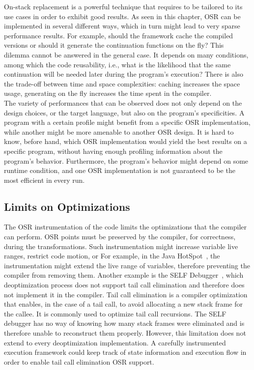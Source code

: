 On-stack replacement is a powerful technique that requires to be tailored to its use cases in order to exhibit good results.
As seen in this chapter, OSR can be implemented in several different ways, which in turn might lead to very sparse performance results.
For example, should the framework cache the compiled versions or should it generate the continuation functions on the fly?
This dilemma cannot be answered in the general case.
It depends on many conditions, among which the code reusability, i.e., what is the likelihood that the same continuation will be needed later during the program's execution?
There is also the trade-off between time and space complexities: caching increases the space usage, generating on the fly increases the time spent in the compiler.\\

The variety of performances that can be observed does not only depend on the design choices, or the target language, but also on the program's specificities.
A program with a certain profile might benefit from a specific OSR implementation, while another might be more amenable to another OSR design.
It is hard to know, before hand, which OSR implementation would yield the best results on a specific program, without having enough profiling information about the program's behavior. 
Furthermore, the program's behavior might depend on some runtime condition, and one OSR implementation is not guaranteed to be the most efficient in every run.  

\subsection{Limits on Optimizations}

The OSR instrumentation of the code limits the optimizations that the compiler can perform.
OSR points must be preserved by the compiler, for correctness, during the transformations.
Such instrumentation might increase variable live ranges, restrict code motion, or 
For example, in the Java HotSpot~\cite{paleczny2001java}, the instrumentation might extend the live range of variables, therefore preventing the compiler from removing them.
Another example is the SELF Debugger~\cite{holzle1992debugging}, which deoptimization process does not support tail call elimination and therefore does not implement it in the compiler.
Tail call elimination is a compiler optimization that enables, in the case of a tail call, to avoid allocating a new stack frame for the callee. 
It is commonly used to optimize tail call recursions.
The SELF debugger has no way of knowing how many stack frames were eliminated and is therefore unable to reconstruct them properly.
However, this limitation does not extend to every deoptimization implementation.
A carefully instrumented execution framework could keep track of state information and execution flow in order to enable tail call elimination OSR support.\\

